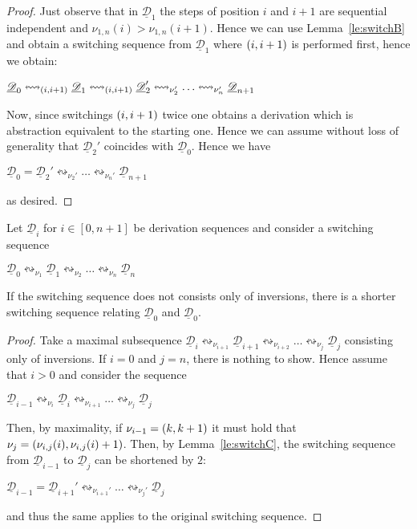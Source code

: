 \documentclass[a4paper,UKenglish,cleveref,pdftex, thm-restate,numberwithinsect,anonymous]{lipics}
\newcommand{\interval}[2][1]{\ensuremath{[{#1},{#2}]}}
\newcommand{\dder}[1]{\mathscr{#1}}
\newcommand{\der}[1]{\underline{\dder{#1}}}
\newcommand{\shift}[1]{\ensuremath{\mathrel{{\leftrightsquigarrow}_{#1}}}}
\begin{document}
\begin{proof}
  Just observe that in $\der{D}_1$ the steps of position $i$ and $i+1$
  are sequential independent and $\nu_{1,n}(i) >
  \nu_{1,n}(i+1)$. Hence we can use Lemma~\ref{le:switchB} and obtain
  a switching sequence from $\der{D}_1$ where $\transp{i}$ is
  performed first, hence we obtain:
  \begin{center}
    $\der{D}_0 \shift{\transp{i}}
    \der{D}_1 \shift{\transp{i}}
    \der{D}_2' \shift{\nu_2'} \ldots
    \shift{\nu_n'} \der{D}_{n+1}$
  \end{center}

  Now, since switchings $\transp{i}$ twice one obtains a derivation
  which is abstraction equivalent to the starting one. Hence we can
  assume without loss of generality that $\der{D}_2'$ coincides with
  $\der{D}_0$. Hence we have
  \begin{center}
    $\der{D}_0 =
    \der{D}_2' \shift{\nu_2'} \ldots
    \shift{\nu_n'} \der{D}_{n+1}$
  \end{center}
  as desired.
\end{proof}


\begin{lemma}
  \label{le:switchD}
  Let $\der{D}_i$ for $i \in \interval[0]{n+1}$ be derivation sequences
  and consider a switching sequence
  \begin{center}
    $\der{D}_0 \shift{\nu_1} \der{D}_1 \shift{\nu_2} \ldots
    \shift{\nu_n}\der{D}_n$
  \end{center}
  If the switching sequence does not consists only of inversions,
  there is a shorter switching sequence relating $\der{D}_0$ and
  $\der{D}_0$.
\end{lemma}

\begin{proof}
  Take a maximal subsequence
  $\der{D}_i \shift{\nu_{i+1}} \der{D}_{i+1} \shift{\nu_{i+2}} \ldots
  \shift{\nu_j}\der{D}_j$ consisting only of inversions.
  If $i=0$ and $j=n$, there is nothing to show. Hence assume that
  $i>0$ and consider the sequence
  \begin{center}
    $\der{D}_{i-1} \shift{\nu_{i}} \der{D}_{i} \shift{\nu_{i+1}} \ldots
    \shift{\nu_j}\der{D}_j$
  \end{center}
  Then, by maximality, if $\nu_{i-1}=\transp{k}$ it must hold that
  $\nu_{j}=\transp{\nu_{i,j}(i)}$. Then, by Lemma~\ref{le:switchC},
  the switching sequence from $\der{D}_{i-1}$ to $\der{D}_{j}$ can be
  shortened by $2$:
  \begin{center}
    $\der{D}_{i-1} = \der{D}_{i+1}' \shift{\nu_{i+1}'} \ldots
    \shift{\nu_j'}\der{D}_j$
  \end{center}
  and thus the same applies to the original switching sequence.
\end{proof}
\end{document}
